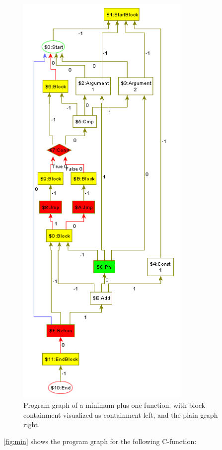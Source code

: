\begin{figure}[htbp]
\begin{minipage}[c]{0.57\textwidth}
		\includegraphics[width=3.3in]{fig/MinPlusPlainArguments.png}
	\end{minipage}
	\caption{Program graph of a minimum plus one function, with block containment visualized as containment left, and the plain graph right.}
	\label{fig:min}
\end{figure}

\autoref{fig:min} shows the program graph for the following C-function:

\pagebreak




